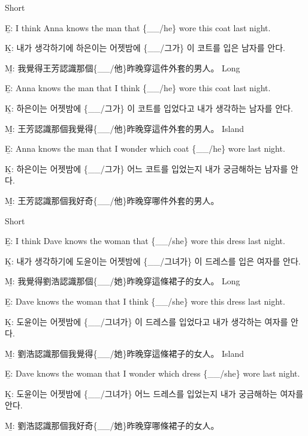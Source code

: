 \pex %
\a Short\par\nobreak
\beginsubsub
\b{E:} I think Anna knows the man that \{\_\_/he\} wore this coat last night.\par\nobreak
\b{K:} \ko 내가 생각하기에 하은이는 어젯밤에 \{\_\_/그가\} 이 코트를 입은 남자를 안다. \normalfont\par\nobreak
\b{M:} \zh 我覺得王芳認識那個\{\_\_/他\}昨晚穿這件外套的男人。 \normalfont
\endsubsub
\a Long\par\nobreak
\beginsubsub
\b{E:} Anna knows the man that I think \{\_\_/he\} wore this coat last night.\par\nobreak
\b{K:} \ko 하은이는 어젯밤에 \{\_\_/그가\} 이 코트를 입었다고 내가 생각하는 남자를 안다. \normalfont\par\nobreak
\b{M:} \zh 王芳認識那個我覺得\{\_\_/他\}昨晚穿這件外套的男人。 \normalfont
\endsubsub
\a Island\par\nobreak
\beginsubsub
\b{E:} Anna knows the man that I wonder which coat \{\_\_/he\} wore last night.\par\nobreak
\b{K:} \ko 하은이는 어젯밤에 \{\_\_/그가\} 어느 코트를 입었는지 내가 궁금해하는 남자를 안다\normalfont.\par\nobreak
\b{M:} \zh 王芳認識那個我好奇\{\_\_/他\}昨晚穿哪件外套的男人。\normalfont
\endsubsub
\xe

\pex %
\a Short\par\nobreak
\beginsubsub
\b{E:} I think Dave knows the woman that \{\_\_/she\} wore this dress last night.\par\nobreak
\b{K:} \ko 내가 생각하기에 도윤이는 어젯밤에 \{\_\_/그녀가\} 이 드레스를 입은 여자를 안다. \normalfont\par\nobreak
\b{M:} \zh 我覺得劉浩認識那個\{\_\_/她\}昨晚穿這條裙子的女人。 \normalfont
\endsubsub
\a Long\par\nobreak
\beginsubsub
\b{E:} Dave knows the woman that I think \{\_\_/she\} wore this dress last night.\par\nobreak
\b{K:} \ko 도윤이는 어젯밤에 \{\_\_/그녀가\} 이 드레스를 입었다고 내가 생각하는 여자를 안다. \normalfont\par\nobreak
\b{M:} \zh 劉浩認識那個我覺得\{\_\_/她\}昨晚穿這條裙子的女人。 \normalfont
\endsubsub
\a Island\par\nobreak
\beginsubsub
\b{E:} Dave knows the woman that I wonder which dress \{\_\_/she\} wore last night.\par\nobreak
\b{K:} \ko 도윤이는 어젯밤에 \{\_\_/그녀가\} 어느 드레스를 입었는지 내가 궁금해하는 여자를 안다\normalfont.\par\nobreak
\b{M:} \zh 劉浩認識那個我好奇\{\_\_/她\}昨晚穿哪條裙子的女人。\normalfont
\endsubsub
\xe

